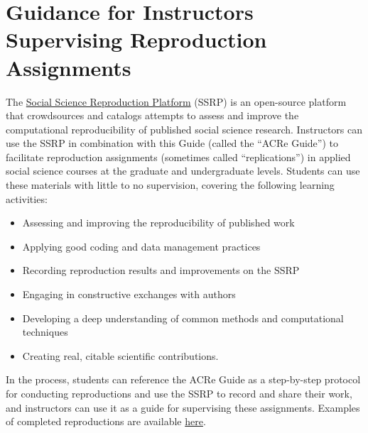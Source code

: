 \documentclass[
]{book}
\providecommand{\tightlist}{%
  \setlength{\itemsep}{0pt}\setlength{\parskip}{0pt}}
\begin{document}
\hypertarget{guidance-for-instructors-supervising-reproduction-assignments}{%
\chapter{Guidance for Instructors Supervising Reproduction Assignments}\label{guidance-for-instructors-supervising-reproduction-assignments}}

The \href{https://www.socialsciencereproduction.org/}{Social Science Reproduction Platform} (SSRP) is an open-source platform that crowdsources and catalogs attempts to assess and improve the computational reproducibility of published social science research. Instructors can use the SSRP in combination with this Guide (called the ``ACRe Guide'') to facilitate reproduction assignments (sometimes called ``replications'') in applied social science courses at the graduate and undergraduate levels. Students can use these materials with little to no supervision, covering the following learning activities:

\begin{itemize}
\tightlist
\item
  Assessing and improving the reproducibility of published work\\
\item
  Applying good coding and data management practices\\
\item
  Recording reproduction results and improvements on the SSRP\\
\item
  Engaging in constructive exchanges with authors\\
\item
  Developing a deep understanding of common methods and computational techniques\\
\item
  Creating real, citable scientific contributions.
\end{itemize}

In the process, students can reference the ACRe Guide as a step-by-step protocol for conducting reproductions and use the SSRP to record and share their work, and instructors can use it as a guide for supervising these assignments. Examples of completed reproductions are available \href{https://www.socialsciencereproduction.org/reproductions/search?query=}{here}.
\end{document}

